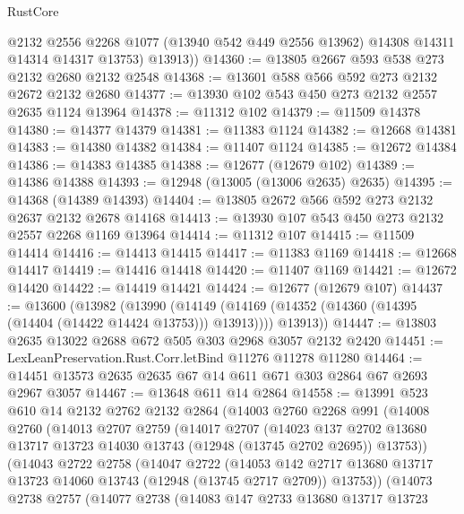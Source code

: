 \begin{lexlean}{RustCore}
\begin{coremodule}
          @2132
          @2556
          @2268
          @1077
          (@13940 @542 @449 @2556 @13962)
          @14308
          @14311
          @14314
          @14317
          @13753)
        @13913))
@14360 := @13805 @2667 @593 @538 @273 @2132 @2680 @2132 @2548
@14368 := @13601 @588 @566 @592 @273 @2132 @2672 @2132 @2680
@14377 := @13930 @102 @543 @450 @273 @2132 @2557 @2635 @1124 @13964
@14378 := @11312 @102
@14379 := @11509 @14378
@14380 := @14377 @14379
@14381 := @11383 @1124
@14382 := @12668 @14381
@14383 := @14380 @14382
@14384 := @11407 @1124
@14385 := @12672 @14384
@14386 := @14383 @14385
@14388 := @12677 (@12679 @102)
@14389 := @14386 @14388
@14393 := @12948 (@13005 (@13006 @2635) @2635)
@14395 := @14368 (@14389 @14393)
@14404 := @13805 @2672 @566 @592 @273 @2132 @2637 @2132 @2678 @14168
@14413 := @13930 @107 @543 @450 @273 @2132 @2557 @2268 @1169 @13964
@14414 := @11312 @107
@14415 := @11509 @14414
@14416 := @14413 @14415
@14417 := @11383 @1169
@14418 := @12668 @14417
@14419 := @14416 @14418
@14420 := @11407 @1169
@14421 := @12672 @14420
@14422 := @14419 @14421
@14424 := @12677 (@12679 @107)
@14437 := @13600
    (@13982
      (@13990
        (@14149 (@14169 (@14352 (@14360 (@14395 (@14404 (@14422 @14424 @13753))) @13913))))
        @13913))
@14447 := @13803 @2635 @13022 @2688 @672 @505 @303 @2968 @3057 @2132 @2420
@14451 := LexLeanPreservation.Rust.Corr.letBind @11276 @11278 @11280
@14464 := @14451 @13573 @2635 @2635 @67 @14 @611 @671 @303 @2864 @67 @2693 @2967 @3057
@14467 := @13648 @611 @14 @2864
@14558 := @13991
    @523
    @610
    @14
    @2132
    @2762
    @2132
    @2864
    (@14003
      @2760
      @2268
      @991
      (@14008
        @2760
        (@14013
          @2707
          @2759
          (@14017
            @2707
            (@14023
              @137
              @2702
              @13680
              @13717
              @13723
              @14030
              @13743
              (@12948 (@13745 @2702 @2695))
              @13753))
          (@14043
            @2722
            @2758
            (@14047
              @2722
              (@14053
                @142
                @2717
                @13680
                @13717
                @13723
                @14060
                @13743
                (@12948 (@13745 @2717 @2709))
                @13753))
            (@14073
              @2738
              @2757
              (@14077
                @2738
                (@14083
                  @147
                  @2733
                  @13680
                  @13717
                  @13723

\end{coremodule}
\end{lexlean}

